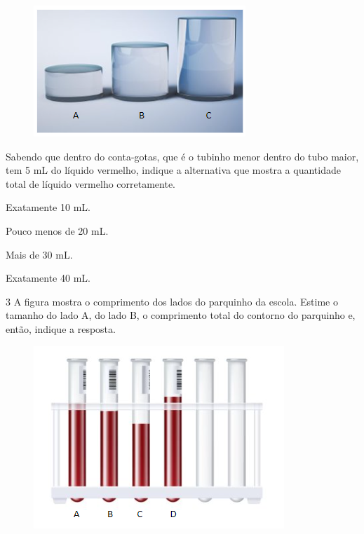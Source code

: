 \begin{figure}[htpb!]
\centering
\includegraphics[width=.2\textwidth]{./media/image46.png}
\end{figure}

\pagebreak

Sabendo que dentro do conta-gotas, que é o tubinho menor dentro do tubo
maior, tem 5 mL do líquido vermelho, indique a alternativa que mostra a
quantidade total de líquido vermelho corretamente.

\begin{minipage}{.5\textwidth}
\begin{escolha}
\item Exatamente 10 mL.

\item Pouco menos de 20 mL.

\item Mais de 30 mL.

\item Exatamente 40 mL.
\end{escolha}
\end{minipage}

\num{3} A figura mostra o comprimento dos lados do parquinho da escola.
Estime o tamanho do lado A, do lado B, o comprimento total do contorno
do parquinho e, então, indique a resposta.

\begin{figure}[htpb!]
\centering
\includegraphics[width=.5\textwidth]{./media/image47.png}
\end{figure}

